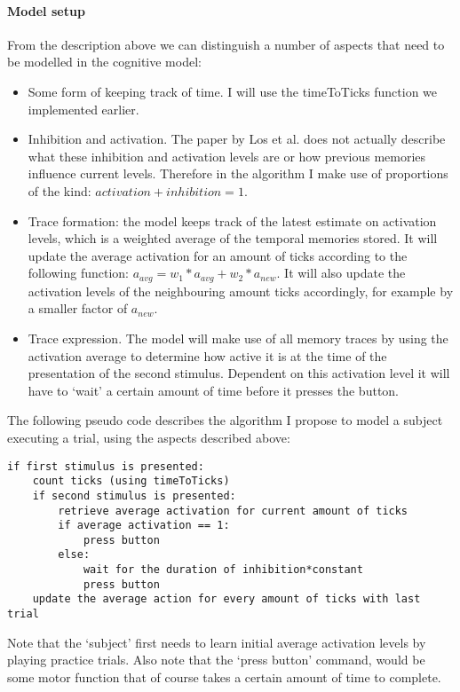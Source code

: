 \documentclass{article}
\begin{document}
\paragraph{Model setup}
From the description above we can distinguish a number of aspects that need to be modelled in the cognitive model:
\begin{itemize}
	\item Some form of keeping track of time. I will use the timeToTicks function we implemented earlier.
	\item Inhibition and activation. The paper by Los et al. does not actually describe what these inhibition and activation levels are or how previous memories influence current levels. Therefore in the algorithm I make use of proportions of the kind: $activation + inhibition = 1$.
	\item Trace formation: the model keeps track of the latest estimate on activation levels, which is a weighted average of the temporal memories stored. It will update the average activation for an amount of ticks according to the following function: $a_{avg} = w_1 * a_{avg} + w_2 * a_{new}$. It will also update the activation levels of the neighbouring amount ticks accordingly, for example by a smaller factor of $a_{new}$.
	\item Trace expression. The model will make use of all memory traces by using the activation average to determine how active it is at the time of the presentation of the second stimulus. Dependent on this activation level it will have to `wait' a certain amount of time before it presses the button.
\end{itemize}
The following pseudo code describes the algorithm I propose to model a subject executing a trial, using the aspects described above:
\begin{lstlisting}
if first stimulus is presented:
	count ticks (using timeToTicks)
	if second stimulus is presented:
		retrieve average activation for current amount of ticks
		if average activation == 1:
			press button
		else:
			wait for the duration of inhibition*constant
			press button
	update the average action for every amount of ticks with last trial
\end{lstlisting}
Note that the `subject' first needs to learn initial average activation levels by playing practice trials. Also note that the `press button' command, would be some motor function that of course takes a certain amount of time to complete.


\end{document}

